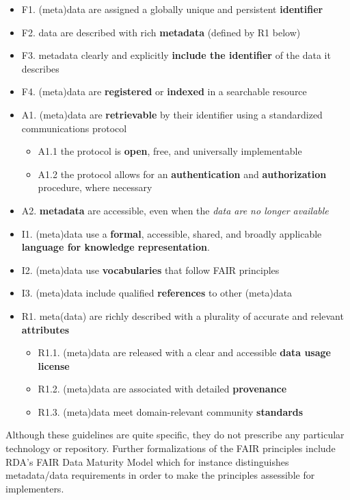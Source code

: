 \begin{itemize}
    \item F1. (meta)data are assigned a globally unique and persistent \textbf{identifier}
    \item F2. data are described with rich \textbf{metadata} (defined by R1 below)
    \item F3. metadata clearly and explicitly \textbf{include the identifier} of the data it describes
    \item F4. (meta)data are \textbf{registered} or \textbf{indexed} in a searchable resource
    \item A1. (meta)data are \textbf{retrievable} by their identifier using a
        standardized communications protocol
        \begin{itemize} 
            \item A1.1 the protocol is \textbf{open}, free, and universally implementable
            \item A1.2 the protocol allows for an \textbf{authentication} and 
            \textbf{authorization} procedure, where necessary
        \end{itemize}
     \item A2. \textbf{metadata} are accessible, even when the \emph{data are no longer available}
     \item I1. (meta)data use a \textbf{formal}, accessible, shared, and
         broadly applicable \textbf{language for knowledge representation}.
     \item I2. (meta)data use \textbf{vocabularies} that follow FAIR principles
     \item I3. (meta)data include qualified \textbf{references} to other (meta)data
     \item R1. meta(data) are richly described with a plurality of
         accurate and relevant \textbf{attributes}
         \begin{itemize}
            \item R1.1. (meta)data are released with a clear and accessible \textbf{data usage license}
            \item R1.2. (meta)data are associated with detailed \textbf{provenance}
            \item R1.3. (meta)data meet domain-relevant community \textbf{standards}
        \end{itemize}     
\end{itemize}

Although these guidelines are quite specific, they do not prescribe any particular technology or repository. Further formalizations of the FAIR principles include RDA's FAIR Data Maturity Model \cite{FAIR Maturity 2020,Bahui 2020} which for instance distinguishes metadata/data requirements in order to make the principles assessible for implementers.

